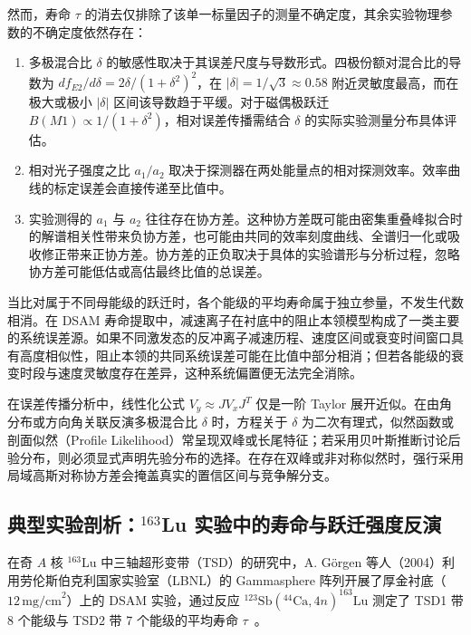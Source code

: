 然而，寿命 $\tau$ 的消去仅排除了该单一标量因子的测量不确定度，其余实验物理参数的不确定度依然存在：
\begin{enumerate}
\item 多极混合比 $\delta$ 的敏感性取决于其误差尺度与导数形式。四极份额对混合比的导数为 $df_{E2}/d\delta = 2\delta / (1+\delta^2)^2$，在 $|\delta| = 1/\sqrt{3} \approx 0.58$ 附近灵敏度最高，而在极大或极小 $|\delta|$ 区间该导数趋于平缓。对于磁偶极跃迁 $B(M1) \propto 1/(1+\delta^2)$，相对误差传播需结合 $\delta$ 的实际实验测量分布具体评估。
\item 相对光子强度之比 $a_1 / a_2$ 取决于探测器在两处能量点的相对探测效率。效率曲线的标定误差会直接传递至比值中。
\item 实验测得的 $a_1$ 与 $a_2$ 往往存在协方差。这种协方差既可能由密集重叠峰拟合时的解谱相关性带来负协方差，也可能由共同的效率刻度曲线、全谱归一化或吸收修正带来正协方差。协方差的正负取决于具体的实验谱形与分析过程，忽略协方差可能低估或高估最终比值的总误差。
\end{enumerate}

当比对属于不同母能级的跃迁时，各个能级的平均寿命属于独立参量，不发生代数相消。在 DSAM 寿命提取中，减速离子在衬底中的阻止本领模型构成了一类主要的系统误差源。如果不同激发态的反冲离子减速历程、速度区间或衰变时间窗口具有高度相似性，阻止本领的共同系统误差可能在比值中部分相消；但若各能级的衰变时段与速度灵敏度存在差异，这种系统偏置便无法完全消除。

在误差传播分析中，线性化公式 $V_y \approx J V_x J^T$ 仅是一阶 Taylor 展开近似。在由角分布或方向角关联反演多极混合比 $\delta$ 时，方程关于 $\delta$ 为二次有理式，似然函数或剖面似然（Profile Likelihood）常呈现双峰或长尾特征；若采用贝叶斯推断讨论后验分布，则必须显式声明先验分布的选择。在存在双峰或非对称似然时，强行采用局域高斯对称协方差会掩盖真实的置信区间与竞争解分支。

\subsection{典型实验剖析：$^{163}$Lu 实验中的寿命与跃迁强度反演}\label{subsec:5-9-7}

在奇 $A$ 核 $^{163}$Lu 中三轴超形变带（TSD）的研究中，A. Görgen 等人（2004）利用劳伦斯伯克利国家实验室（LBNL）的 Gammasphere 阵列开展了厚金衬底（$12\,\text{mg/cm}^2$）上的 DSAM 实验，通过反应 $^{123}\text{Sb}(^{44}\text{Ca}, 4n)^{163}\text{Lu}$ 测定了 TSD1 带 8 个能级与 TSD2 带 7 个能级的平均寿命 $\tau$~\cite{campaign-g07-gorgen-2004-163lu-quadrupole-moments}。

